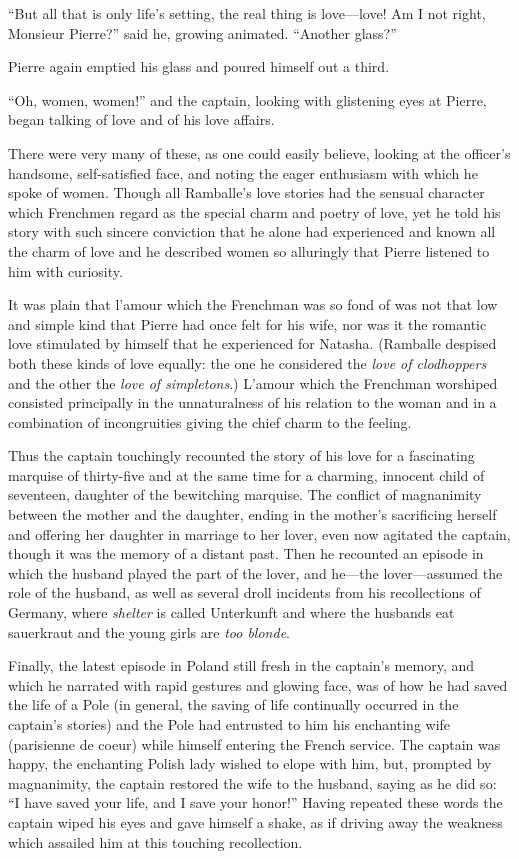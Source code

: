 ``But all that is only life's setting, the real thing is
love---love! Am I not right, Monsieur Pierre?'' said he, growing
animated. ``Another glass?''

Pierre again emptied his glass and poured himself out a third.

``Oh, women, women!'' and the captain, looking with glistening
eyes at Pierre, began talking of love and of his love affairs.

There were very many of these, as one could easily believe,
looking at the officer's handsome, self-satisfied face, and
noting the eager enthusiasm with which he spoke of women. Though
all Ramballe's love stories had the sensual character which
Frenchmen regard as the special charm and poetry of love, yet he
told his story with such sincere conviction that he alone had
experienced and known all the charm of love and he described
women so alluringly that Pierre listened to him with curiosity.

It was plain that l'amour which the Frenchman was so fond of was
not that low and simple kind that Pierre had once felt for his
wife, nor was it the romantic love stimulated by himself that he
experienced for Natasha. (Ramballe despised both these kinds of
love equally: the one he considered the \emph{love of
clodhoppers} and the other the \emph{love of simpletons}.)
L'amour which the Frenchman worshiped consisted principally in
the unnaturalness of his relation to the woman and in a
combination of incongruities giving the chief charm to the
feeling.

Thus the captain touchingly recounted the story of his love for a
fascinating marquise of thirty-five and at the same time for a
charming, innocent child of seventeen, daughter of the bewitching
marquise. The conflict of magnanimity between the mother and the
daughter, ending in the mother's sacrificing herself and offering
her daughter in marriage to her lover, even now agitated the
captain, though it was the memory of a distant past. Then he
recounted an episode in which the husband played the part of the
lover, and he---the lover---assumed the role of the husband, as
well as several droll incidents from his recollections of
Germany, where \emph{shelter} is called Unterkunft and where the
husbands eat sauerkraut and the young girls are \emph{too
blonde}.

Finally, the latest episode in Poland still fresh in the
captain's memory, and which he narrated with rapid gestures and
glowing face, was of how he had saved the life of a Pole (in
general, the saving of life continually occurred in the captain's
stories) and the Pole had entrusted to him his enchanting wife
(parisienne de coeur) while himself entering the French
service. The captain was happy, the enchanting Polish lady wished
to elope with him, but, prompted by magnanimity, the captain
restored the wife to the husband, saying as he did so: ``I have
saved your life, and I save your honor!'' Having repeated these
words the captain wiped his eyes and gave himself a shake, as if
driving away the weakness which assailed him at this touching
recollection.

